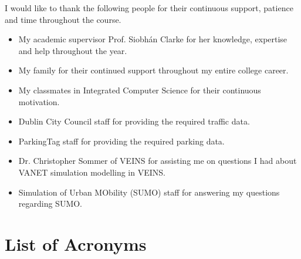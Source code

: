 \documentclass[a4paper, 11pt, oneside]{report}
\begin{document}
\begin{thesisacknowledgments}
I would like to thank the following people for their continuous support, patience and time throughout the course.
\begin{itemize}
    \setlength\itemsep{0em}
    \item My academic supervisor Prof. Siobhán Clarke for her knowledge, expertise and help throughout the year.
    \item My family for their continued support throughout my entire college career.
    \item My classmates in Integrated Computer Science for their continuous motivation.
    \item Dublin City Council staff for providing the required traffic data.
    \item ParkingTag staff for providing the required parking data.
    \item Dr. Christopher Sommer of VEINS for assisting me on questions I had about \ac{VANET} simulation modelling in VEINS.
    \item Simulation of Urban MObility (SUMO) staff for answering my questions regarding SUMO.
\end{itemize}
\end{thesisacknowledgments}

\pagebreak

\tableofcontents                                  %
\listoftables                                     %
\listoffigures                                    %

\pagebreak

\chapter*{List of Acronyms}
\begin{acronym}
\end{acronym}
\end{document}
